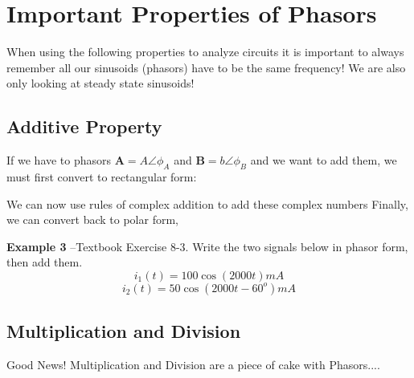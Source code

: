 \documentclass{handout}
\begin{document}
\newpage
\clearpage
\pagebreak

\section{Important Properties of Phasors}
When using the following properties to analyze circuits it is important to always remember all our sinusoids (phasors) have to be the same frequency!  We are also only looking at steady state sinusoids!

\subsection{Additive Property}
If we have to phasors $\mathbf{A} = A\angle\phi_A$ and $\mathbf{B} = b\angle\phi_B$ and we want to add them, we must first convert to rectangular form:
\soln{2in}{
\[
A\angle\phi_A = A\cos\phi_A + jA\sin\phi_A
\]
\[
B\angle\phi_B = B\cos\phi_B + jB\sin\phi_B
\]
}

We can now use rules of complex addition to add these complex numbers
\soln{1in}{
\[
\mathbf{A} +\mathbf{B} = \left[A\cos\phi_A +B\cos\phi_B \right] +j\left[A\sin\phi_A+ B\sin\phi_B \right]
\]
}
Finally, we can convert back to polar form,

\textbf{Example 3} --Textbook Exercise 8-3.  Write the two signals below in phasor form, then add them.
\[i_1(t) = 100\cos\left(2000t\right)mA\]
\[i_2(t) = 50\cos\left(2000t-60^o\right)mA\]

\newpage
\clearpage
\pagebreak
\subsection{Multiplication and Division}
Good News!  Multiplication and Division are a piece of cake with Phasors....
\end{document}
